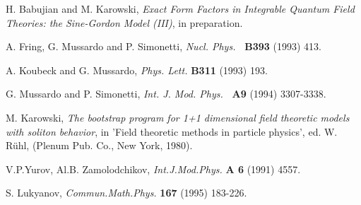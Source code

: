 \documentclass[a4paper,a4paper]{article}
\begin{document}
\begin{thebibliography}{99}
  H. Babujian and M. Karowski, \emph{Exact Form Factors in
Integrable Quantum Field Theories: the Sine-Gordon Model (III)}, in
preparation.

  A. Fring, G. Mussardo and P. Simonetti, \emph{Nucl. Phys.}%
\textbf{\ B393} (1993) 413.

  A. Koubeck and G. Mussardo, \emph{Phys. Lett. }\textbf{B311}
(1993) 193.

  G. Mussardo and P. Simonetti, \emph{Int. J. Mod. Phys.}\textbf{%
\ A9} (1994) 3307-3338.

  M. Karowski, \emph{The bootstrap program for 1+1 dimensional
field theoretic models with soliton behavior}, in 'Field theoretic methods
in particle physics', ed. W. R\"{u}hl, (Plenum Pub. Co., New York, 1980).

 V.P.Yurov, Al.B. Zamolodchikov, \emph{Int.J.Mod.Phys.}
\textbf{A 6} (1991) 4557.

  S. Lukyanov, \emph{Commun.Math.Phys.} \textbf{ 167} (1995)
183-226.
\end{thebibliography}
\end{document}

